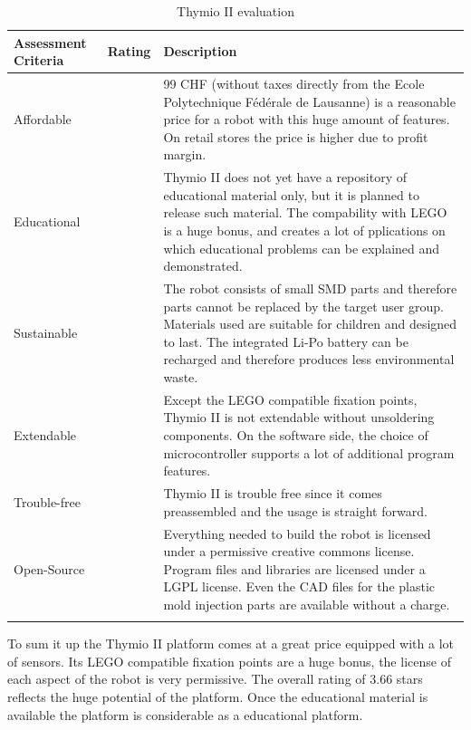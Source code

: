 \documentclass[11pt,a4paper]{article}
\newcounter{starnumber}
\newcommand{\stars}[1]{
  \forloop{starnumber}{1}{\value{starnumber} < 6}{
    \ifthenelse{#1 < \value{starnumber}}{\ding{73}}{\ding{72}}%
  }
}
\begin{document}
\begin{longtable}{p{}p{}p{}}
\toprule
Assessment Criteria    & Rating & Description \\
\midrule
Affordable  & \stars{4}    & 99 CHF (without taxes directly from the Ecole Polytechnique Fédérale de Lausanne) is a reasonable price for a robot with this huge amount of features. On retail stores the price is higher due to profit margin.\\
Educational & \stars{3}     & Thymio II does not yet have a repository of educational material only, but it is planned to release such material. The compability with LEGO is a huge bonus, and creates a lot of pplications on which educational problems can be explained and demonstrated.\\
Sustainable  & \stars{3}     & The robot consists of small SMD parts and therefore parts cannot be replaced by the target user group. Materials used are suitable for children and designed to last. The integrated Li-Po battery can be recharged and therefore produces less environmental waste.\\
Extendable & \stars{3} & Except the LEGO compatible fixation points, Thymio II is not extendable without unsoldering components. On the software side, the choice of microcontroller supports a lot of additional program features.\\
Trouble-free & \stars{4} & Thymio II is trouble free since it comes preassembled and the usage is straight forward.\\
Open-Source & \stars{5} & Everything needed to build the robot is licensed under a permissive creative commons license. Program files and libraries are licensed under a LGPL license. Even the CAD files for the plastic mold injection parts are available without a charge.\\
\bottomrule
\caption{Thymio II evaluation}
\label{tbl:thymio_eval}
\end{longtable}

To sum it up the Thymio II platform comes at a great price equipped with a lot of sensors. Its LEGO compatible fixation points are a huge bonus, the license of each aspect of the robot is very permissive. The overall rating of 3.66 stars reflects the huge potential of the platform. Once the educational material is available the platform is considerable as a educational platform.
\end{document}
